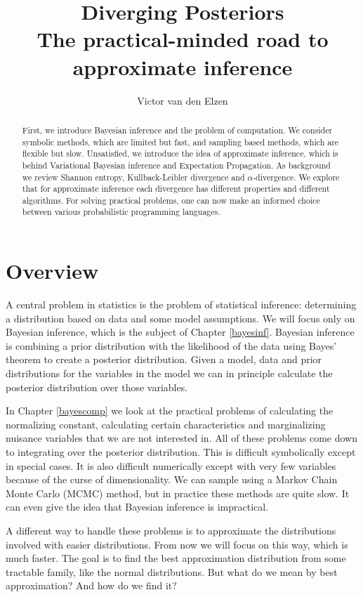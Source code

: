 \documentclass[12pt,vu]{adammath}
\title{Diverging Posteriors \\
\large The practical-minded road to approximate inference}
\author[ven500@student.vu.nl, 2509763]{Victor van den Elzen}
\theoremstyle{plain}
\theoremstyle{definition}
\theoremstyle{remark}
\begin{document}
\maketitle

\begin{abstract}
First, we introduce Bayesian inference and the problem of computation.
We consider symbolic methods, which are limited but fast, and sampling based methods, which are flexible but slow.
Unsatisfied, we introduce the idea of approximate inference, which is behind Variational Bayesian inference and Expectation Propagation.
As background we review Shannon entropy, Kullback-Leibler divergence and $\alpha$-divergence.
We explore that for approximate inference each divergence has different properties and different algorithms.
For solving practical problems, one can now make an informed choice between various probabilistic programming languages.
\end{abstract}

\tableofcontents

\chapter{Overview}
A central problem in statistics is the problem of statistical inference:
determining a distribution based on data and some model assumptions.
We will focus only on Bayesian inference, which is the subject of Chapter \ref{bayesinf}.
Bayesian inference is combining a prior distribution with the likelihood of the data using Bayes' theorem to create a posterior distribution.
Given a model, data and prior distributions for the variables in the model we can in principle calculate the posterior distribution over those variables.

In Chapter \ref{bayescomp} we look at the practical problems of calculating the normalizing constant, calculating certain characteristics and marginalizing nuisance variables that we are not interested in.
All of these problems come down to integrating over the posterior distribution.
This is difficult symbolically except in special cases.
It is also difficult numerically except with very few variables because of the curse of dimensionality.
We can sample using a Markov Chain Monte Carlo (MCMC) method, but in practice these methods are quite slow.
It can even give the idea that Bayesian inference is impractical.

A different way to handle these problems is to approximate the distributions involved with easier distributions.
From now we will focus on this way, which is much faster.
The goal is to find the best approximation distribution from some tractable family, like the normal distributions.
But what do we mean by best approximation?
And how do we find it?
\end{document}
